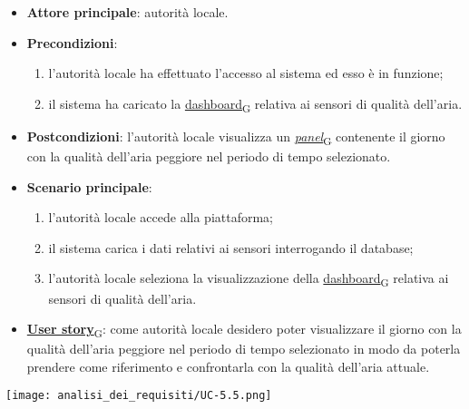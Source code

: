 \begin{itemize}
	\item \textbf{Attore principale}: autorità locale.
	\item \textbf{Precondizioni}:
	      \begin{enumerate}
		      \item l'autorità locale ha effettuato l'accesso al sistema ed esso è in funzione;
		      \item il sistema ha caricato la \href{https://7last.github.io/docs/pb/documentazione-interna/glossario\#dashboard}{dashboard\textsubscript{G}} relativa ai sensori di qualità dell'aria.
	      \end{enumerate}
	\item \textbf{Postcondizioni}: l'autorità locale visualizza un \href{https://7last.github.io/docs/pb/documentazione-interna/glossario\#panel}{\textit{panel}\textsubscript{G}} contenente il giorno con la qualità dell'aria peggiore nel periodo di tempo selezionato.
	\item \textbf{Scenario principale}:
	      \begin{enumerate}
		      \item l'autorità locale accede alla piattaforma;
		      \item il sistema carica i dati relativi ai sensori interrogando il database;
		      \item l'autorità locale seleziona la visualizzazione della \href{https://7last.github.io/docs/pb/documentazione-interna/glossario\#dashboard}{dashboard\textsubscript{G}} relativa ai sensori di qualità dell'aria.
	      \end{enumerate}
	\item \href{https://7last.github.io/docs/pb/documentazione-interna/glossario\#user-story}{\textbf{User story}\textsubscript{G}}:
	      come autorità locale desidero poter visualizzare il giorno con la qualità dell'aria peggiore nel periodo di tempo selezionato
	      in modo da poterla prendere come riferimento e confrontarla con la qualità dell'aria attuale.
\end{itemize}
\begin{center}
	\texttt{[image: analisi\_dei\_requisiti/UC-5.5.png]}
\end{center}


